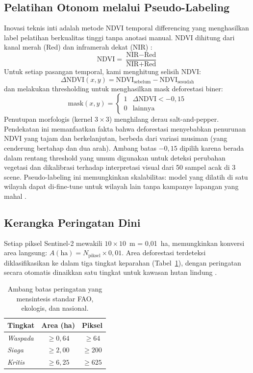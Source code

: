 \documentclass[10pt,a4paper,onecolumn]{article}
\begin{document}
\subsection{Pelatihan Otonom melalui Pseudo-Labeling}
Inovasi teknis inti adalah metode NDVI temporal differencing yang
menghasilkan label pelatihan berkualitas tinggi tanpa anotasi manual.
NDVI dihitung dari kanal merah (Red) dan inframerah dekat (NIR) \cite{tucker1979red}:
\begin{equation}
\text{NDVI} = \frac{\text{NIR} - \text{Red}}{\text{NIR} + \text{Red}}
\end{equation}
Untuk setiap pasangan temporal, kami menghitung selisih NDVI:
\begin{equation}
\Delta\text{NDVI}(x,y) = \text{NDVI}_{\text{sebelum}} - \text{NDVI}_{\text{sesudah}}
\end{equation}
dan melakukan thresholding untuk menghasilkan mask deforestasi biner:
\begin{equation}
\text{mask}(x,y) = 
\begin{cases}
1 & \Delta\text{NDVI} < -0,15 \\
0 & \text{lainnya}
\end{cases}
\end{equation}
Penutupan morfologis (kernel $3\times3$) menghilang derau
salt-and-pepper. Pendekatan ini memanfaatkan fakta bahwa deforestasi
menyebabkan penurunan NDVI yang tajam dan berkelanjutan, berbeda dari
variasi musiman (yang cenderung bertahap dan dua arah). Ambang batas
$-0,15$ dipilih karena berada dalam rentang threshold yang umum
digunakan untuk deteksi perubahan vegetasi \cite{gandhi2015ndvi} dan
dikalibrasi terhadap interpretasi visual dari 50 sampel acak
di 3 scene. Pseudo-labeling ini memungkinkan skalabilitas: model yang
dilatih di satu wilayah dapat di-fine-tune untuk wilayah lain tanpa
kampanye lapangan yang mahal \cite{gonzalez2008digital}.

\subsection{Kerangka Peringatan Dini}
Setiap piksel Sentinel-2 mewakili $10\times10$~m = 0,01~ha, memungkinkan
konversi area langsung: $A(\text{ha}) = N_{\text{piksel}} \times 0,01$.
Area deforestasi terdeteksi diklasifikasikan ke dalam tiga tingkat
keparahan (Tabel~\ref{tab:thresholds}), dengan peringatan secara
otomatis dinaikkan satu tingkat untuk kawasan hutan lindung \cite{esa2024sentinel2}.

\begin{table}[ht]
\centering
\caption{Ambang batas peringatan yang mensintesis standar FAO,
ekologis, dan nasional.}
\label{tab:thresholds}
\small
\begin{tabular}{lcc}
\toprule
Tingkat & Area (ha) & Piksel \\
\midrule
\textit{Waspada} & $\ge 0,64$ & $\ge 64$ \\
\textit{Siaga}   & $\ge 2,00$ & $\ge 200$ \\
\textit{Kritis}  & $\ge 6,25$ & $\ge 625$ \\
\bottomrule
\end{tabular}
\end{table}
\end{document}

